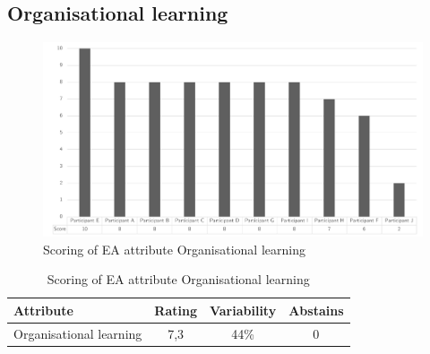 \subsection{Organisational learning}
\begin{figure}[H]
	\centering
	\includegraphics[width=0.9\linewidth]{images/scoreeaorganisationallearning}
	\caption[Scoring of EA attribute Organisational learning]{Scoring of EA attribute Organisational learning}
	\label{fig:appscoringeaorganiationallearning}
\end{figure}
\begin{table}[H]
	\centering
	\begin{tabular}{p{}ccc}
		\toprule
		\textbf{Attribute} & \textbf{Rating} & \textbf{Variability} & \textbf{Abstains} \\
		\midrule
		Organisational learning & 7,3 & 44\% & 0 \\%
		\bottomrule
	\end{tabular}%
	\caption[Scoring of EA attribute Organisational learning]{Scoring of EA attribute Organisational learning}
	\label{tab:appscoringeaorganisationallearning}%
\end{table}%
\newpage
